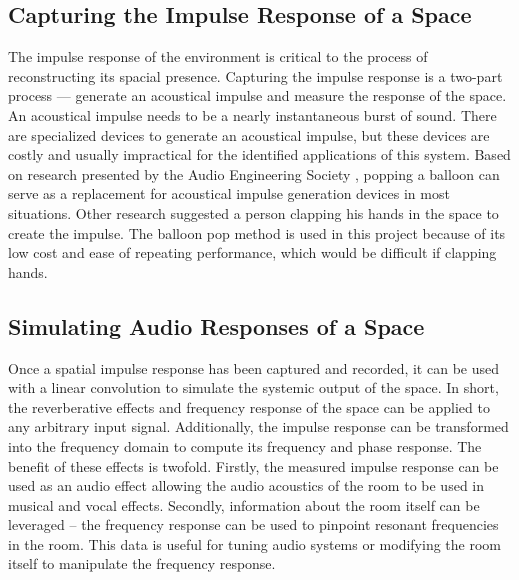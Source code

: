 \documentclass[letterpaper, 11pt, onecolumn, oneside]{article}
\begin{document}
    \subsection*{Capturing the Impulse Response of a Space}
    The impulse response of the environment is critical to the process of reconstructing its spacial presence.
    Capturing the impulse response is a two-part process --- generate an acoustical impulse and measure the response of the space.
    An acoustical impulse needs to be a nearly instantaneous burst of sound.
    There are specialized devices to generate an acoustical impulse, but these devices are costly and usually impractical for the identified applications of this system.
    Based on research presented by the Audio Engineering Society \cite{abel2010estimating}, popping a balloon can serve as a replacement for acoustical impulse generation devices in most situations.
    Other research suggested a person clapping his hands in the space to create the impulse.
    The balloon pop method is used in this project because of its low cost and ease of repeating performance, which would be difficult if clapping hands.

    \subsection*{Simulating Audio Responses of a Space}
    Once a spatial impulse response has been captured and recorded, it can be used with a linear convolution to simulate the systemic output of the space.
    In short, the reverberative effects and frequency response of the space can be applied to any arbitrary input signal. Additionally, the impulse response can be transformed into the frequency domain to compute its frequency and phase response.
    The benefit of these effects is twofold. Firstly, the measured impulse response can be used as an audio effect allowing the audio acoustics of the room to be used in musical and vocal effects.
    Secondly, information about the room itself can be leveraged -- the frequency response can be used to pinpoint resonant frequencies in the room.
    This data is useful for tuning audio systems or modifying the room itself to manipulate the frequency response.

\end{document}
